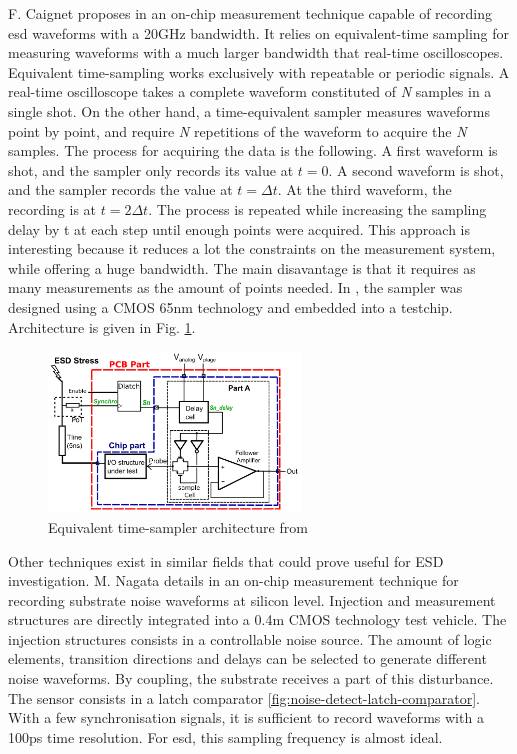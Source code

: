 F. Caignet proposes in \cite{eq-time-sampling} an on-chip measurement technique capable of recording \gls{esd} waveforms with a 20GHz bandwidth.
It relies on equivalent-time sampling for measuring waveforms with a much larger bandwidth that real-time oscilloscopes.
Equivalent time-sampling works exclusively with repeatable or periodic signals.
A real-time oscilloscope takes a complete waveform constituted of \textit{N} samples in a single shot.
On the other hand, a time-equivalent sampler measures waveforms point by point, and require \textit{N} repetitions of the waveform to acquire the \textit{N} samples.
The process for acquiring the data is the following.
A first waveform is shot, and the sampler only records its value at $t=0$.
A second waveform is shot, and the sampler records the value at $t=\Delta t$.
At the third waveform, the recording is at $t=2\Delta t$.
The process is repeated while increasing the sampling delay by \textDelta{}t at each step until enough points were acquired.
This approach is interesting because it reduces a lot the constraints on the measurement system, while offering a huge bandwidth.
The main disavantage is that it requires as many measurements as the amount of points needed.
In \cite{eq-time-sampling}, the sampler was designed using a CMOS 65nm technology and embedded into a testchip.
Architecture is given in Fig. \ref{fig:eq-time-sampler-architecture}.

\begin{figure}[!h]
  \centering
  \includegraphics[width=0.6\textwidth]{src/1/figures/architecture_equivalent_time_sampler.png}
  \caption{Equivalent time-sampler architecture from \cite{eq-time-sampling}}
  \label{fig:eq-time-sampler-architecture}
\end{figure}

Other techniques exist in similar fields that could prove useful for ESD investigation.
M. Nagata details in \cite{substrate-noise-measurement} an on-chip measurement technique for recording substrate noise waveforms at silicon level.
Injection and measurement structures are directly integrated into a 0.4\textmu{}m CMOS technology test vehicle.
The injection structures consists in a controllable noise source.
The amount of logic elements, transition directions and delays can be selected to generate different noise waveforms.
By coupling, the substrate receives a part of this disturbance.
The sensor consists in a latch comparator \ref{fig:noise-detect-latch-comparator}.
With a few synchronisation signals, it is sufficient to record waveforms with a 100ps time resolution.
For \gls{esd}, this sampling frequency is almost ideal.

